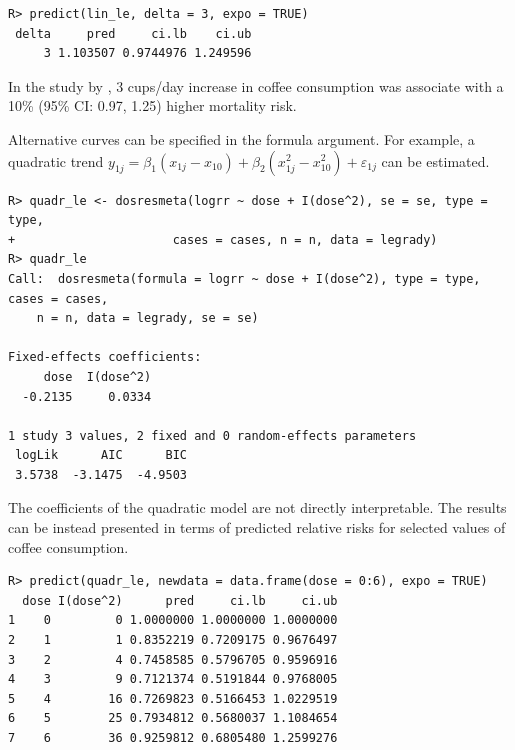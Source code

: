 \documentclass[11pt,a4paper,twoside,openany]{book}\usepackage{knitr}
\begin{document}
{{\begin{knitrout}\footnotesize
{}\color{fgcolor}\begin{kframe}
\begin{verbatim}
R> predict(lin_le, delta = 3, expo = TRUE)
 delta     pred     ci.lb    ci.ub
     3 1.103507 0.9744976 1.249596
\end{verbatim}
\end{kframe}
\end{knitrout}


\noindent In the study by \cite{legrady1987coffee}, 3 cups/day increase in coffee consumption was associate with a 10\% (95\% CI: 0.97, 1.25) higher mortality risk.

Alternative curves can be specified in the formula argument. For example, a quadratic trend $y_{1j} = \beta_1 (x_{1j} - x_{10}) + \beta_2 (x_{1j}^2 - x_{10}^2) + \varepsilon_{1j}$ can be estimated.
\begin{knitrout}\footnotesize
{}\color{fgcolor}\begin{kframe}
\begin{verbatim}
R> quadr_le <- dosresmeta(logrr ~ dose + I(dose^2), se = se, type = type,
+                      cases = cases, n = n, data = legrady)
R> quadr_le
Call:  dosresmeta(formula = logrr ~ dose + I(dose^2), type = type, cases = cases, 
    n = n, data = legrady, se = se)

Fixed-effects coefficients:
     dose  I(dose^2)  
  -0.2135     0.0334  

1 study 3 values, 2 fixed and 0 random-effects parameters
 logLik      AIC      BIC  
 3.5738  -3.1475  -4.9503  
\end{verbatim}
\end{kframe}
\end{knitrout}

\noindent The coefficients of the quadratic model are not directly interpretable. The results can be instead presented in terms of predicted relative risks for selected values of coffee consumption.
\begin{knitrout}\footnotesize
{}\color{fgcolor}\begin{kframe}
\begin{verbatim}
R> predict(quadr_le, newdata = data.frame(dose = 0:6), expo = TRUE)
  dose I(dose^2)      pred     ci.lb     ci.ub
1    0         0 1.0000000 1.0000000 1.0000000
2    1         1 0.8352219 0.7209175 0.9676497
3    2         4 0.7458585 0.5796705 0.9596916
4    3         9 0.7121374 0.5191844 0.9768005
5    4        16 0.7269823 0.5166453 1.0229519
6    5        25 0.7934812 0.5680037 1.1084654
7    6        36 0.9259812 0.6805480 1.2599276
\end{verbatim}
\end{kframe}
\end{knitrout}


}}
\end{document}
